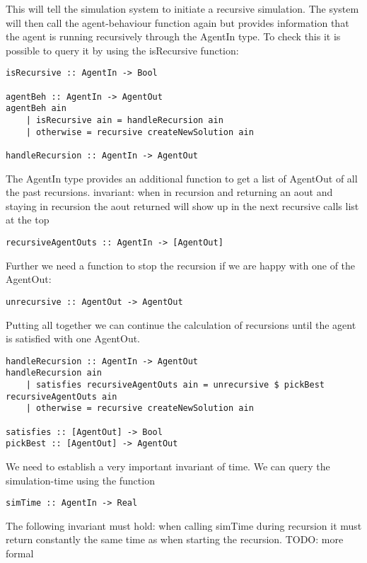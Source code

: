 This will tell the simulation system to initiate a recursive simulation. The system will then call the agent-behaviour function again but provides information that the agent is running recursively through the AgentIn type. To check this it is possible to query it by using the isRecursive function:

\begin{lstlisting}[frame=single]
isRecursive :: AgentIn -> Bool

agentBeh :: AgentIn -> AgentOut
agentBeh ain 
	| isRecursive ain = handleRecursion ain
	| otherwise = recursive createNewSolution ain
	
handleRecursion :: AgentIn -> AgentOut
\end{lstlisting}

The AgentIn type provides an additional function to get a list of AgentOut of all the past recursions.  invariant: when in recursion and returning an aout and staying in recursion the aout returned will show up in the next recursive calls list at the top

\begin{lstlisting}[frame=single]
recursiveAgentOuts :: AgentIn -> [AgentOut]
\end{lstlisting}

Further we need a function to stop the recursion if we are happy with one of the AgentOut:

\begin{lstlisting}[frame=single]
unrecursive :: AgentOut -> AgentOut
\end{lstlisting}

Putting all together we can continue the calculation of recursions until the agent is satisfied with one AgentOut. 

\begin{lstlisting}[frame=single]
handleRecursion :: AgentIn -> AgentOut
handleRecursion ain 
	| satisfies recursiveAgentOuts ain = unrecursive $ pickBest recursiveAgentOuts ain
	| otherwise = recursive createNewSolution ain

satisfies :: [AgentOut] -> Bool
pickBest :: [AgentOut] -> AgentOut
\end{lstlisting}

We need to establish a very important invariant of time. We can query the simulation-time using the function
\begin{lstlisting}[frame=single]
simTime :: AgentIn -> Real
\end{lstlisting}

The following invariant must hold: when calling simTime during recursion it must return constantly the same time as when starting the recursion. TODO: more formal

